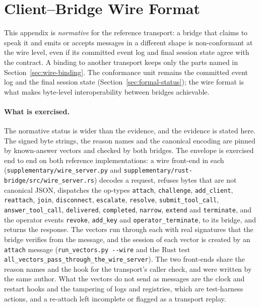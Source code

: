 \section{Client--Bridge Wire Format}
\label{app:wire-format}

This appendix is \emph{normative} for the reference transport: a bridge
that claims to speak it and emits or accepts messages in a different
shape is non-conformant at the wire level, even if its committed event
log and final session state agree with the contract. A binding to
another transport keeps only the parts named in
Section~\ref{sec:wire-binding}. The conformance unit remains the committed event log
and the final session state (Section~\ref{sec:formal-status}); the
wire format is what makes byte-level interoperability between
bridges achievable.

\paragraph{What is exercised.} The normative status is wider than the
evidence, and the evidence is stated here. The signed byte strings, the
reason names and the canonical encoding are pinned by known-answer vectors
and checked by both bridges. The envelope is exercised end to end on both
reference implementations: a wire front-end in each
(\texttt{supplementary/wire\_server.py} and
\texttt{supplementary/rust-bridge/src/wire\_server.rs}) decodes a request,
refuses bytes that are not canonical JSON, dispatches the op-types
\texttt{attach}, \texttt{challenge}, \texttt{add\_client},
\texttt{reattach}, \texttt{join}, \texttt{disconnect},
\texttt{escalate}, \texttt{resolve}, \texttt{submit\_tool\_call},
\texttt{answer\_tool\_call}, \texttt{delivered}, \texttt{completed},
\texttt{narrow}, \texttt{extend} and \texttt{terminate}, and the operator
events \texttt{revoke}, \texttt{add\_key} and \texttt{operator\_terminate},
to its bridge, and returns the response. The vectors run through each with
real signatures that the bridge verifies from the message, and the session
of each vector is created by an \texttt{attach} message
(\texttt{run\_vectors.py -{}-wire} and the Rust test
\texttt{all\_vectors\_pass\_through\_the\_wire\_server}). The two
front-ends share the reason names and the hook for the transport's
caller check, and were written by the same author. What the vectors do not
send as messages are the clock and restart hooks and the tampering of logs
and registries, which are test-harness actions, and a re-attach left
incomplete or flagged as a transport replay.

